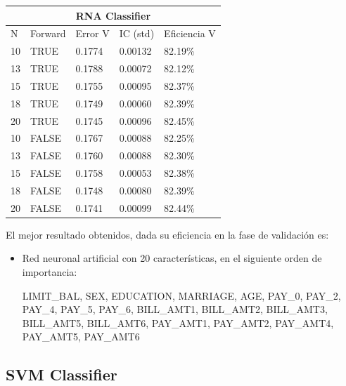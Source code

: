\documentclass[conference]{IEEEtran}
\begin{document}
\begin{table}[H]
\centering
\begin{tabular}{lllll}
\hline
\multicolumn{5}{c}{\textbf{RNA Classifier}} \\ \hline
N & Forward & Error V & IC (std) & Eficiencia V \\ \hline
10 & TRUE & 0.1774 & 0.00132 & 82.19\% \\
13 & TRUE & 0.1788 & 0.00072 & 82.12\% \\
15 & TRUE & 0.1755 & 0.00095 & 82.37\% \\
18 & TRUE & 0.1749 & 0.00060 & 82.39\% \\
20 & TRUE & 0.1745 & 0.00096 & 82.45\% \\
10 & FALSE & 0.1767 & 0.00088 & 82.25\% \\
13 & FALSE & 0.1760 & 0.00088 & 82.30\% \\
15 & FALSE & 0.1758 & 0.00053 & 82.38\% \\
18 & FALSE & 0.1748 & 0.00080 & 82.39\% \\
20 & FALSE & 0.1741 & 0.00099 & 82.44\% \\ \hline
\end{tabular}
\end{table}\hfill


El mejor resultado obtenidos, dada su eficiencia en la fase de validación es:
\begin{itemize}
\item Red neuronal artificial con 20 características, en el siguiente orden de importancia:

LIMIT\_BAL, SEX, EDUCATION, MARRIAGE, AGE, PAY\_0, PAY\_2, PAY\_4, PAY\_5, PAY\_6, BILL\_AMT1, BILL\_AMT2, BILL\_AMT3, BILL\_AMT5, BILL\_AMT6, PAY\_AMT1, PAY\_AMT2, PAY\_AMT4, PAY\_AMT5, PAY\_AMT6

\end{itemize}


\subsection{SVM Classifier}\hfill
\end{document}
